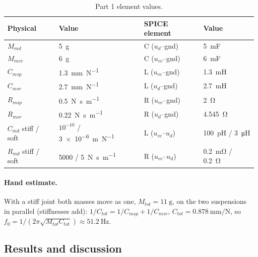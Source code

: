 \documentclass[a4paper,11pt]{article}
\begin{document}
\begin{table}[H]\centering\small
\begin{tabular}{@{}llll@{}}\toprule
Physical & Value & SPICE element & Value \\ \midrule
$M_{md}$ & \SI{5}{\gram} & C ($u_d$--gnd) & \SI{5}{\milli\farad} \\
$M_{mvc}$ & \SI{6}{\gram} & C ($u_{vc}$--gnd) & \SI{6}{\milli\farad} \\
$C_{msp}$ & \SI{1.3}{\milli\metre\per\newton} & L ($u_{vc}$--gnd) & \SI{1.3}{\milli\henry} \\
$C_{msr}$ & \SI{2.7}{\milli\metre\per\newton} & L ($u_d$--gnd) & \SI{2.7}{\milli\henry} \\
$R_{msp}$ & \SI{0.5}{\newton\second\per\metre} & R ($u_{vc}$--gnd) & \SI{2}{\ohm} \\
$R_{msr}$ & \SI{0.22}{\newton\second\per\metre} & R ($u_d$--gnd) & \SI{4.545}{\ohm} \\
$C_{md}$ stiff / soft & $10^{-10}$ / \SI{3e-6}{\metre\per\newton} & L ($u_{vc}$--$u_d$) & \SI{100}{\pico\henry} / \SI{3}{\micro\henry} \\
$R_{md}$ stiff / soft & 5000 / \SI{5}{\newton\second\per\metre} & R ($u_{vc}$--$u_d$) & \SI{0.2}{\milli\ohm} / \SI{0.2}{\ohm} \\
\bottomrule\end{tabular}
\caption{Part 1 element values.}
\end{table}

\paragraph{Hand estimate.} With a stiff joint both masses move as one, $M_{tot} = \SI{11}{\gram}$, on the two
suspensions in parallel (stiffnesses add): $1/C_{tot} = 1/C_{msp} + 1/C_{msr}$, $C_{tot} = \SI{0.878}{\milli\metre\per\newton}$,
so $f_0 = 1/(2\pi\sqrt{M_{tot}C_{tot}}) \approx \SI{51.2}{\hertz}$.


\subsection{Results and discussion}

\FloatBarrier
\end{document}
